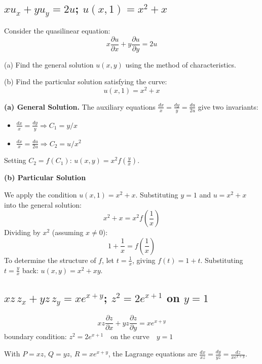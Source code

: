 \documentclass[a4paper,11pt]{article} %
\begin{document}
\subsection{\texorpdfstring{$x u_x + y u_y = 2u$; $u(x,1)=x^2+x$}{Solve x u_x + y u_y = 2u by characteristics; particular solution satisfying u(x,1)=x^2+x}}

\begin{problembox}
Consider the quasilinear equation:
$$x \frac{\partial u}{\partial x} + y \frac{\partial u}{\partial y} = 2u$$

(a) Find the general solution $u(x, y)$ using the method of characteristics.

(b) Find the particular solution satisfying the curve:
$$u(x, 1) = x^2 + x$$
\end{problembox}


\textbf{(a) General Solution.}
The auxiliary equations $\frac{dx}{x} = \frac{dy}{y} = \frac{du}{2u}$ give two invariants:
\begin{itemize}
    \item $\frac{dx}{x}=\frac{dy}{y} \Rightarrow C_1 = y/x$
    \item $\frac{dx}{x}=\frac{du}{2u} \Rightarrow C_2 = u/x^2$
\end{itemize}
Setting $C_2=f(C_1)$: $\displaystyle\boxed{u(x,y)=x^2 f\!\left(\tfrac{y}{x}\right)}$.

\textbf{(b) Particular Solution}

We apply the condition $u(x, 1) = x^2 + x$. Substituting $y=1$ and $u = x^2+x$ into the general solution:
$$ x^2 + x = x^2 f\left(\frac{1}{x}\right) $$
Dividing by $x^2$ (assuming $x \neq 0$):
$$ 1 + \frac{1}{x} = f\left(\frac{1}{x}\right) $$
To determine the structure of $f$, let $t = \frac{1}{x}$, giving $f(t) = 1 + t$.
Substituting $t = \frac{y}{x}$ back: $u(x, y) = x^2 + xy$.

\newpage
\subsection{\texorpdfstring{$xz\,z_x + yz\,z_y = xe^{x+y}$; $z^2=2e^{x+1}$ on $y=1$}{Solve quasilinear PDE xz z_x + yz z_y = xe^{x+y} with BC z^2=2e^{x+1} at y=1}}


\begin{problembox}

   $$ xz \frac{\partial z}{\partial x} + yz \frac{\partial z}{\partial y} = x e^{x+y}$$
 boundary condition:
    $z^2 = 2e^{x+1} \quad \text{on the curve} \quad y = 1$
\end{problembox}
With $P=xz$, $Q=yz$, $R=xe^{x+y}$, the Lagrange equations are $\frac{dx}{xz}=\frac{dy}{yz}=\frac{dz}{xe^{x+y}}$.
\end{document}
